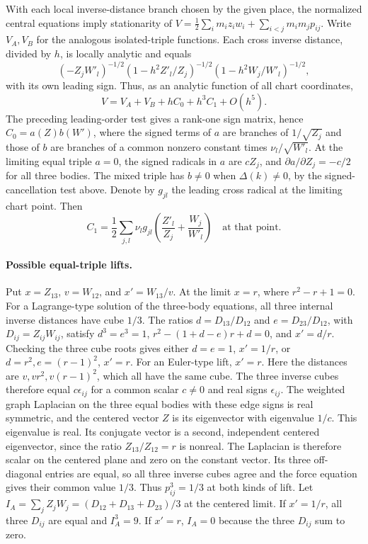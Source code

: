 \documentclass[11pt,letterpaper]{article}
\theoremstyle{definition}
\begin{document}
With each local inverse-distance branch chosen by the given place, the
normalized central equations imply stationarity of
\(V=\frac12\sum_i m_i z_iw_i+\sum_{i<j}m_im_jp_{ij}\).
Write \(V_A,V_B\) for the analogous isolated-triple functions. Each cross
inverse distance, divided by \(h\), is locally analytic and equals
\[
 (-Z_jW'_l)^{-1/2}
 (1-h^2Z'_l/Z_j)^{-1/2}(1-h^2W_j/W'_l)^{-1/2},
\]
with its own leading sign. Thus, as an analytic function of all chart
coordinates,
\[
 V=V_A+V_B+h C_0+h^3 C_1+O(h^5).
\]
The preceding leading-order test gives a rank-one sign matrix, hence
\(C_0=a(Z)b(W')\), where the signed terms of \(a\) are branches of
\(1/\sqrt{Z_j}\) and those of \(b\) are branches of a common nonzero
constant times \(\nu_l/\sqrt{W'_l}\). At the limiting equal triple
\(a=0\), the signed radicals in \(a\) are \(c Z_j\), and
\(\partial a/\partial Z_j=-c/2\) for all three bodies. The mixed
triple has \(b\ne0\) when $\Delta(k)\ne0$, by the signed-cancellation
test above. Denote by \(g_{jl}\) the leading cross
radical at the limiting chart point. Then
\[
 C_1=\frac12\sum_{j,l}\nu_l g_{jl}
    \left(\frac{Z'_l}{Z_j}+\frac{W_j}{W'_l}\right)
 \quad\text{at that point}.
\]

\paragraph{Possible equal-triple lifts.}
Put \(x=Z_{13}\), \(v=W_{12}\), and \(x'=W_{13}/v\).
At the limit \(x=r\), where \(r^2-r+1=0\).
For a Lagrange-type solution of the three-body equations,
all three internal inverse distances have cube \(1/3\).
The ratios \(d=D_{13}/D_{12}\) and \(e=D_{23}/D_{12}\), with
\(D_{ij}=Z_{ij}W_{ij}\), satisfy \(d^3=e^3=1\),
\(r^2-(1+d-e)r+d=0\), and \(x'=d/r\).
Checking the three cube roots gives either \(d=e=1\),
\(x'=1/r\), or \(d=r^2,e=(r-1)^2\), \(x'=r\).
For an Euler-type lift, \(x'=r\). Here the distances are
\(v,vr^2,v(r-1)^2\), which all have the same cube. The three inverse
cubes therefore equal \(c\epsilon_{ij}\) for a common scalar \(c\ne0\)
and real signs \(\epsilon_{ij}\). The weighted graph Laplacian on the
three equal bodies with these edge signs is real symmetric, and the
centered vector \(Z\) is its eigenvector with eigenvalue \(1/c\).
This eigenvalue is real. Its conjugate vector is a second, independent
centered eigenvector, since the ratio \(Z_{13}/Z_{12}=r\) is nonreal.
The Laplacian is therefore scalar on the centered plane and zero on
the constant vector. Its three off-diagonal entries are equal, so all
three inverse cubes agree and the force equation gives their common
value \(1/3\).
Thus \(p_{ij}^3=1/3\) at both kinds of lift. Let
\(I_A=\sum_j Z_j W_j=(D_{12}+D_{13}+D_{23})/3\) at the centered
limit. If \(x'=1/r\), all three \(D_{ij}\) are equal and \(I_A^3=9\).
If \(x'=r\), \(I_A=0\) because the three \(D_{ij}\) sum to zero.
\end{document}
